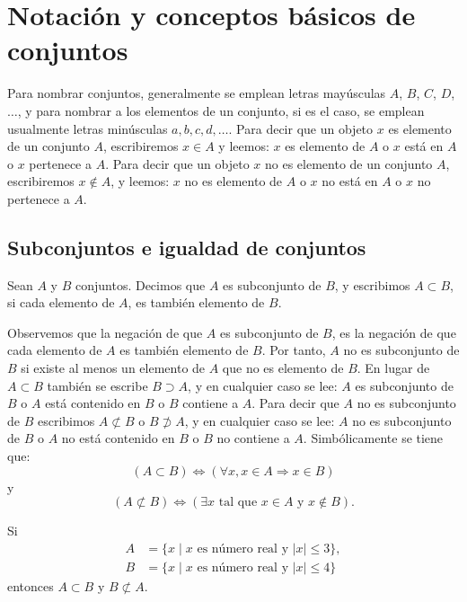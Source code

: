 \section{Notación y conceptos básicos de conjuntos}

Para nombrar conjuntos, generalmente se emplean letras mayúsculas $A$, $B$, $C$, $D$, $\dots$, y para nombrar a los elementos de un conjunto, si es el caso, se emplean usualmente letras minúsculas $a, b, c, d, \dots$. Para decir que un objeto $x$ es elemento de un conjunto $A$, escribiremos $x \in A$ y leemos: $x$ es elemento de $A$ o $x$ está en $A$ o $x$ pertenece a $A$. Para decir que un objeto $x$ no es elemento de un conjunto $A$, escribiremos $x \notin A$, y leemos: $x$ no es elemento de $A$ o $x$ no está en $A$ o $x$ no pertenece a $A$.

\subsection{Subconjuntos e igualdad de conjuntos}

\begin{definicion}{}{}
    Sean $A$ y $B$ conjuntos. Decimos que $A$ es subconjunto de $B$, y escribimos $A \subset B$, si cada elemento de $A$, es también elemento de $B$.
\end{definicion}

Observemos que la negación de que $A$ es subconjunto de $B$, es la negación de que cada elemento de $A$ es también elemento de $B$. Por tanto, $A$ no es subconjunto de $B$ si existe al menos un elemento de $A$ que no es elemento de $B$. En lugar de $A \subset B$ también se escribe $B \supset A$, y en cualquier caso se lee: $A$ es subconjunto de $B$ o $A$ está contenido en $B$ o $B$ contiene a $A$. Para decir que $A$ no es subconjunto de $B$ escribimos $A \not \subset B$ o $B \not \supset A$, y en cualquier caso se lee: $A$ no es subconjunto de $B$ o $A$ no está contenido en $B$ o $B$ no contiene a $A$. Simbólicamente se tiene que:
$$(A \subset B) \Longleftrightarrow (\forall x, x \in A \Longrightarrow x \in B)$$
y
$$(A \not \subset B) \Longleftrightarrow (\exists x \text{ tal que } x \in A \text{ y } x \notin B).$$
\begin{examplebox}{}{}
    Si
    \begin{align*}
        A & = \{x \mid x \text { es número real y }|x| \leq 3\}, \\
        B & = \{x \mid x \text { es número real y }|x| \leq 4\}
    \end{align*}
    entonces $A \subset B$ y $B \not \subset A$.
\end{examplebox}

